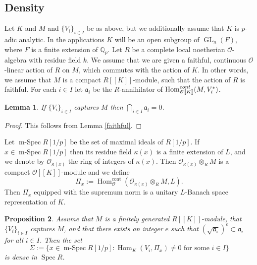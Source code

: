 \documentclass[11pt]{article}
\let\mathcal\mathscr
\newtheorem{prop}{Proposition}[section]
\newtheorem{lem}[prop]{Lemma}
\theoremstyle{definition}
\DeclareMathOperator{\Hom}{Hom}
\DeclareMathOperator{\GL}{GL}
\DeclareMathOperator{\Spec}{Spec}
\DeclareMathOperator{\mSpec}{m-Spec}
\newcommand{\br}[1]{[\![#1]\!]}
\newcommand{\Qp}{\mathbb {Q}_p}
\newcommand{\cO}{\mathcal{O}}
\newcommand{\cont}{\mathrm{cont}}
\begin{document}
\subsection{Density}

Let $K$ and $M$ and $\{V_i\}_{i\in I}$ be as above, but we additionally assume that $K$ is $p$-adic analytic. In the applications $K$ will be an open subgroup of $\GL_n(F)$, where $F$ is a finite extension of $\Qp$.
Let $R$ be a complete local noetherian $\cO$-algebra with residue field $k$. We assume that we are given a faithful, continuous
$\cO$-linear action of $R$ on $M$, which commutes with the action of $K$. In other words, we assume that $M$ is a compact $R\br {K}$-module, such that the action of $R$ is faithful.
For each $i\in I$ let $\mathfrak a_i$ be the $R$-annihilator of $\Hom_{\cO\br{K}}^{\rm cont}(M, V_i^*)$.

\begin{lem}\label{caught_it} If $\{V_i\}_{i\in I}$ captures $M$ then $\bigcap_{i\in I} \mathfrak a_i= 0$.
\end{lem}

\begin{proof} This follows from Lemma \ref{faithful}.
\end{proof}

Let $\mSpec R[1/p]$ be the set of maximal ideals of $R[1/p]$. If $x\in \mSpec R[1/p]$ then its residue field $\kappa(x)$ is a finite extension of $L$, and we denote by $\cO_{\kappa(x)}$
the ring of integers of $\kappa(x)$. Then $\cO_{\kappa(x)}\otimes_R M$ is a compact $\cO\br{K}$-module and
we define\vspace*{-3pt}
\[
\Pi_x:=\Hom^{\cont}_{\cO}(\cO_{\kappa(x)}\otimes_R M, L).
\]
Then $\Pi_x$ equipped with the supremum norm is a unitary $L$-Banach space representation of $K$.

\begin{prop}\label{dense_cap} Assume that $M$ is a finitely generated $R\br{K}$-module,
that $\{V_i\}_{i \in I}$ captures $M$,
and that there exists an integer $e$ such that $(\sqrt{\mathfrak a_i})^e \subset \mathfrak a_i$ for all $i\in I$. Then the set\vspace*{-3pt}
\[
\Sigma:=\{ x\in \mSpec R[1/p]: \Hom_K(V_i, \Pi_x)\neq 0 \text{ for some } i\in I\}
\]
is dense in $\Spec R$.
\end{prop}
\end{document}
